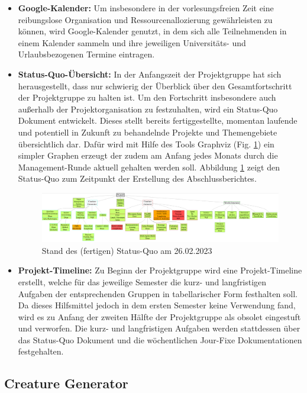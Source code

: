 \begin{itemize}
	\item \textbf{Google-Kalender: } Um insbesondere in der vorlesungsfreien Zeit eine reibungslose Organisation und Ressourcenallozierung gewährleisten zu können, wird Google-Kalender genutzt, in dem sich alle Teilnehmenden in einem Kalender sammeln und ihre jeweiligen Universitäts- und Urlaubsbezogenen Termine eintragen.
	\item \textbf{Status-Quo-Übersicht: } In der Anfangszeit der Projektgruppe hat sich herausgestellt, dass nur schwierig der Überblick über den Gesamtfortschritt der Projektgruppe zu halten ist. Um den Fortschritt insbesondere auch außerhalb der Projektorganisation zu festzuhalten, wird ein Status-Quo Dokument entwickelt. Dieses stellt bereits fertiggestellte, momentan laufende und potentiell in Zukunft zu behandelnde Projekte und Themengebiete übersichtlich dar. Dafür wird mit Hilfe des Tools Graphviz (Fig. \ref{fig:status-quo}) ein simpler Graphen erzeugt der zudem am Anfang jedes Monats durch die Management-Runde aktuell gehalten werden soll. Abbildung \ref{fig:status-quo} zeigt den Status-Quo zum Zeitpunkt der Erstellung des Abschlussberichtes.
	\begin{figure}
		\centering
		\includegraphics[width=0.7\linewidth]{resources/img/Graphviz_fin.png}
		\caption{Stand des (fertigen) Status-Quo am 26.02.2023}
		\label{fig:status-quo}
	\end{figure}
	\item \textbf{Projekt-Timeline: } Zu Beginn der Projektgruppe wird eine Projekt-Timeline erstellt, welche für das jeweilige Semester die kurz- und langfristigen Aufgaben der entsprechenden Gruppen in tabellarischer Form festhalten soll. Da dieses Hilfsmittel jedoch in dem ersten Semester keine Verwendung fand, wird es zu Anfang der zweiten Hälfte der Projektgruppe als obsolet eingestuft und verworfen. Die kurz- und langfristigen Aufgaben werden stattdessen über das Status-Quo Dokument und die wöchentlichen Jour-Fixe Dokumentationen festgehalten.
\end{itemize}



\subsection{Creature Generator}
\label{subsec:creature-generation-orga}

